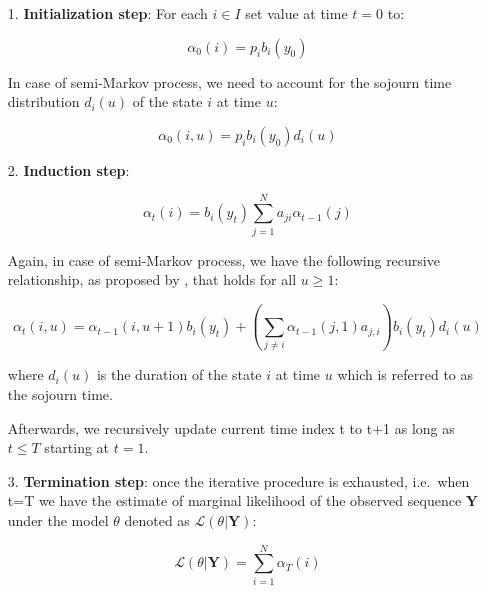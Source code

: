 \begin{itemize}
    \item[1.] \textbf{Initialization step}: For each $i \in I$ set value at time $t=0$ to:
    
    \begin{equation}
        \alpha_0(i)= p_i b_i(y_0)
    \end{equation}

    In case of semi-Markov process, we need to account for the sojourn time distribution $d_i(u)$ of the state $i$ at time $u$:

    \begin{equation}
        \alpha_0(i,u) = p_i b_i(y_0) d_i(u)
    \end{equation}

    \item[2.] \textbf{Induction step}: 
    
    \begin{equation}
        \alpha_t(i) = b_i(y_t) \sum\limits_{j=1}^N a_{ji} \alpha_{t-1}(j)
    \end{equation}

    Again, in case of semi-Markov process, we have the following recursive relationship, as proposed by \citep{Yu2013}, that holds for all $u \geq 1$:

    \begin{equation}
        \alpha_t(i,u) = \alpha_{t-1}(i,u+1) b_i(y_t) + \left( \sum\limits_{j \neq i} \alpha_{t-1}(j,1) a_{j,i} \right) b_i(y_t) d_i(u)
    \end{equation}

    where $d_i(u)$ is the duration of the state $i$ at time $u$ which is referred to as the sojourn time. 
    
    Afterwards, we recursively update current time index t to t+1 as long as $t \leq T$ starting at $t=1$.
    
    \item[3.] \textbf{Termination step}: once the iterative procedure is exhausted, i.e.\ when t=T we have the estimate of marginal likelihood of the observed sequence $\textbf{Y}$ under the model $\theta$ denoted as
    $\mathcal{L}(\theta| \textbf{Y})$:
    
    \begin{equation} \label{eq:loglikeF}
        \mathcal{L}(\theta| \textbf{Y}) = \sum_{i=1}^N \alpha_T(i)
    \end{equation}
    
    \end{itemize}

